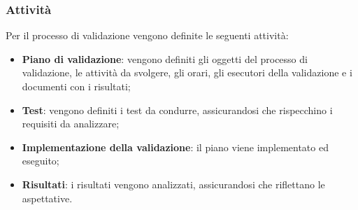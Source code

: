 	\subsubsection{Attività}
	Per il processo di validazione vengono definite le seguenti attività:
	\begin{itemize}
	    \item \textbf{Piano di validazione}: vengono definiti gli oggetti del processo di validazione, le attività da svolgere, gli orari, gli esecutori della validazione e i documenti con i risultati;
	    \item \textbf{Test}: vengono definiti i test da condurre, assicurandosi che rispecchino i requisiti da analizzare;
	    \item \textbf{Implementazione della validazione}: il piano viene implementato ed eseguito;
	    \item \textbf{Risultati}: i risultati vengono analizzati, assicurandosi che riflettano le aspettative.
	\end{itemize}
